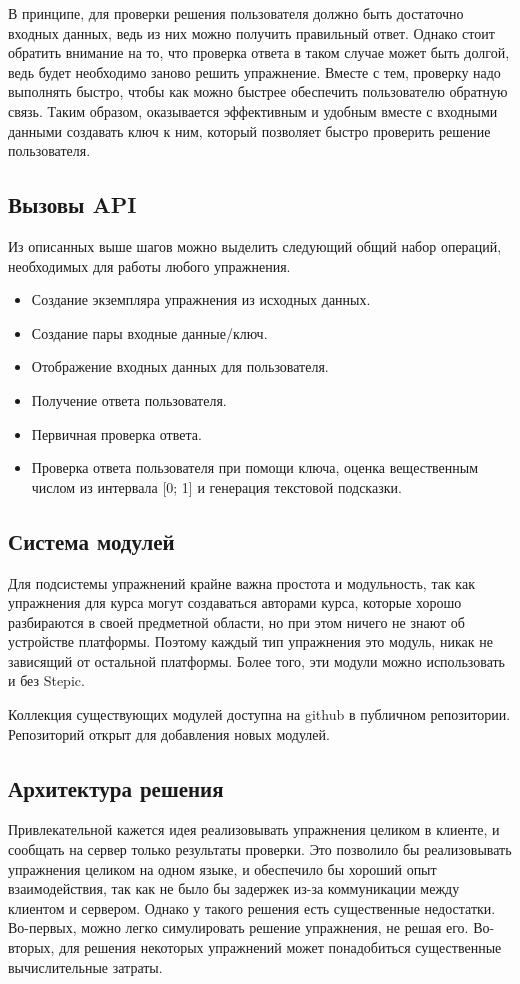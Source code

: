 \documentclass{matmex-diploma-custom}
\begin{document}
В принципе, для проверки решения пользователя должно быть достаточно
входных данных, ведь из них можно получить правильный ответ. Однако
стоит обратить внимание на то, что проверка ответа в таком случае
может быть долгой, ведь будет необходимо заново решить
упражнение. Вместе с тем, проверку надо выполнять быстро, чтобы как
можно быстрее обеспечить пользователю обратную связь. Таким образом,
оказывается эффективным и удобным вместе с входными данными создавать
ключ к ним, который позволяет быстро проверить решение пользователя.

\subsection{Вызовы API}
Из описанных выше шагов можно выделить следующий общий набор операций,
необходимых для работы любого упражнения.

\begin{itemize}
\item Создание экземпляра упражнения из исходных данных.
\item Создание пары входные данные/ключ.
\item Отображение входных данных для пользователя.
\item Получение ответа пользователя.
\item Первичная проверка ответа.
\item Проверка ответа пользователя при помощи ключа, оценка
  вещественным числом из интервала [0; 1] и генерация текстовой подсказки.
\end{itemize}

\subsection{Система модулей}
Для подсистемы упражнений крайне важна простота и модульность, так как
упражнения для курса могут создаваться авторами курса, которые хорошо
разбираются в своей предметной области, но при этом ничего не знают об
устройстве платформы. Поэтому каждый тип упражнения это модуль, никак
не зависящий от остальной платформы. Более того, эти модули можно
использовать и без Stepic.

Коллекция существующих модулей доступна на github в публичном
репозитории\cite{plugins:repo}. Репозиторий открыт для добавления
новых модулей.

\subsection{Архитектура решения}
Привлекательной кажется идея реализовывать упражнения целиком в
клиенте, и сообщать на сервер только результаты проверки. Это
позволило бы реализовывать упражнения целиком на одном языке, и
обеспечило бы хороший опыт взаимодействия, так как не было бы задержек
из-за коммуникации между клиентом и сервером. Однако у такого решения
есть существенные недостатки. Во-первых, можно легко симулировать
решение упражнения, не решая его. Во-вторых, для решения некоторых
упражнений может понадобиться существенные вычислительные затраты.
\end{document}
